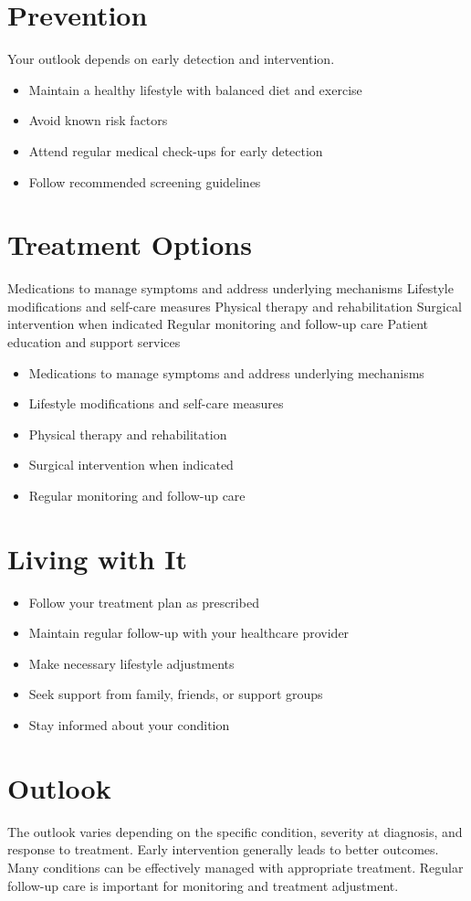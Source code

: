 \section{Prevention}
Your outlook depends on early detection and intervention.

\begin{itemize}[noitemsep]
  \item Maintain a healthy lifestyle with balanced diet and exercise
  \item Avoid known risk factors
  \item Attend regular medical check-ups for early detection
  \item Follow recommended screening guidelines
\end{itemize}
\section{Treatment Options}
Medications to manage symptoms and address underlying mechanisms Lifestyle modifications and self-care measures Physical therapy and rehabilitation Surgical intervention when indicated Regular monitoring and follow-up care Patient education and support services

\begin{itemize}[noitemsep]
  \item Medications to manage symptoms and address underlying mechanisms
  \item Lifestyle modifications and self-care measures
  \item Physical therapy and rehabilitation
  \item Surgical intervention when indicated
  \item Regular monitoring and follow-up care
\end{itemize}
\section{Living with It}
\begin{itemize}[noitemsep]
  \item Follow your treatment plan as prescribed
  \item Maintain regular follow-up with your healthcare provider
  \item Make necessary lifestyle adjustments
  \item Seek support from family, friends, or support groups
  \item Stay informed about your condition
\end{itemize}
\section{Outlook}
The outlook varies depending on the specific condition, severity at diagnosis, and response to treatment. Early intervention generally leads to better outcomes. Many conditions can be effectively managed with appropriate treatment. Regular follow-up care is important for monitoring and treatment adjustment.
